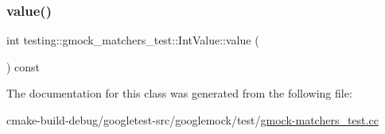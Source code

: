 \subsubsection{\texorpdfstring{value()}{value()}}
{\footnotesize\ttfamily int testing\+::gmock\+\_\+matchers\+\_\+test\+::\+Int\+Value\+::value (\begin{DoxyParamCaption}{ }\end{DoxyParamCaption}) const\hspace{0.3cm}{\ttfamily [inline]}}



The documentation for this class was generated from the following file\+:\begin{DoxyCompactItemize}
\item 
cmake-\/build-\/debug/googletest-\/src/googlemock/test/\mbox{\hyperlink{gmock-matchers__test_8cc}{gmock-\/matchers\+\_\+test.\+cc}}\end{DoxyCompactItemize}
